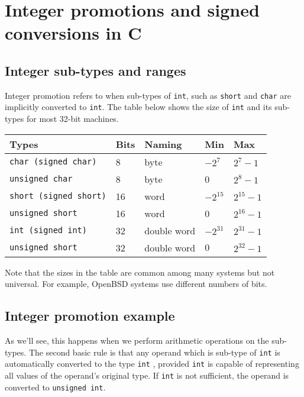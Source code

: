 \section{Integer promotions and signed conversions in C}



\subsection{Integer sub-types and ranges}

Integer promotion refers to when sub-types of \texttt{int}, such as \texttt{short} and \texttt{char} are implicitly converted to \texttt{int}. The table below shows the size of \texttt{int} and its sub-types for most 32-bit machines.

\begin{tabular}{p{}p{}p{}p{}p{}} \toprule %
{Types} & {Bits} & {Naming} & {Min} &{Max} \\ \midrule
    \texttt{char (signed char)} & 8 & byte & $-2^7$ & $2^7-1$\\
    \texttt{unsigned char} &  8 & byte &0 & $2^8-1$\\
    \texttt{short (signed short)} &  16 & word & $-2^{15}$ & $2^{15}-1$\\
    \texttt{unsigned short} &  16 & word & 0 & $2^{16}-1$\\
    \texttt{int (signed int)} &  32 & double word & $-2^{31}$ & $2^{31}-1$\\
    \texttt{unsigned short} &  32 & double word & $0$ & $2^{32}-1$\\
    \bottomrule
\end{tabular}

Note that the sizes in the table are common among many systems but not universal. For example, OpenBSD systems use different numbers of bits.


\subsection{Integer promotion example}

As we'll see, this happens when we perform arithmetic operations on the sub-types. The second basic rule is that any operand which is sub-type of \texttt{int} is automatically converted to the type \texttt{int} , provided \texttt{int}  is capable of representing all values of the operand’s original type. If \texttt{int}  is not sufficient, the operand is converted to \texttt{unsigned int}.

